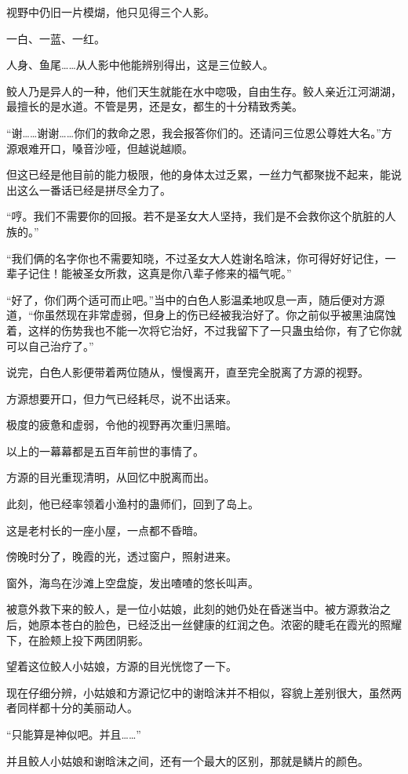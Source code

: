 \begin{this_body}
视野中仍旧一片模煳，他只见得三个人影。

一白、一蓝、一红。

人身、鱼尾……从人影中他能辨别得出，这是三位鲛人。

鲛人乃是异人的一种，他们天生就能在水中唿吸，自由生存。鲛人亲近江河湖湖，最擅长的是水道。不管是男，还是女，都生的十分精致秀美。

“谢……谢谢……你们的救命之恩，我会报答你们的。还请问三位恩公尊姓大名。”方源艰难开口，嗓音沙哑，但越说越顺。

但这已经是他目前的能力极限，他的身体太过乏累，一丝力气都聚拢不起来，能说出这么一番话已经是拼尽全力了。

“哼。我们不需要你的回报。若不是圣女大人坚持，我们是不会救你这个肮脏的人族的。”

“我们俩的名字你也不需要知晓，不过圣女大人姓谢名晗沫，你可得好好记住，一辈子记住！能被圣女所救，这真是你八辈子修来的福气呢。”

“好了，你们两个适可而止吧。”当中的白色人影温柔地叹息一声，随后便对方源道，“你虽然现在非常虚弱，但身上的伤已经被我治好了。你之前似乎被黑油腐蚀着，这样的伤势我也不能一次将它治好，不过我留下了一只蛊虫给你，有了它你就可以自己治疗了。”

说完，白色人影便带着两位随从，慢慢离开，直至完全脱离了方源的视野。

方源想要开口，但力气已经耗尽，说不出话来。

极度的疲惫和虚弱，令他的视野再次重归黑暗。

以上的一幕幕都是五百年前世的事情了。

方源的目光重现清明，从回忆中脱离而出。

此刻，他已经率领着小渔村的蛊师们，回到了岛上。

这是老村长的一座小屋，一点都不昏暗。

傍晚时分了，晚霞的光，透过窗户，照射进来。

窗外，海鸟在沙滩上空盘旋，发出喳喳的悠长叫声。

被意外救下来的鲛人，是一位小姑娘，此刻的她仍处在昏迷当中。被方源救治之后，她原本苍白的脸色，已经泛出一丝健康的红润之色。浓密的睫毛在霞光的照耀下，在脸颊上投下两团阴影。

望着这位鲛人小姑娘，方源的目光恍惚了一下。

现在仔细分辨，小姑娘和方源记忆中的谢晗沫并不相似，容貌上差别很大，虽然两者同样都十分的美丽动人。

“只能算是神似吧。并且……”

并且鲛人小姑娘和谢晗沫之间，还有一个最大的区别，那就是鳞片的颜色。


\end{this_body}
